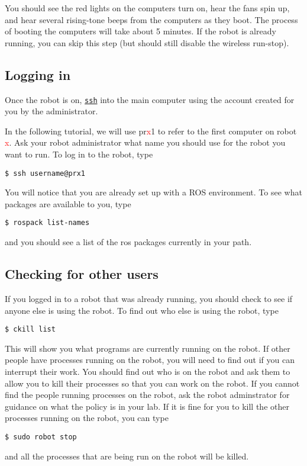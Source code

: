 You should see the red lights on the computers turn on, hear the fans spin up, and hear several rising-tone beeps from the computers 
as they boot.  The process of booting the computers will take about 5 minutes.  If the robot is already running, you can 
skip this step (but should still disable the wireless run-stop).
\subsection{Logging in}
Once the robot is on, \texttt{\href{http://unixhelp.ed.ac.uk/CGI/man-cgi?ssh}{ssh}} into the main computer using the account 
created for you by the administrator. 

In the following tutorial, we will use pr\textcolor{red}{x}1 to refer to the first computer on robot \textcolor{red}{x}.  
Ask your robot  administrator what name you should use for the robot you want to run. To log in to the robot, type
\begin{verbatim}
$ ssh username@prx1
\end{verbatim}
You will notice that you are already set up with a ROS environment.  To see what packages are available to you, type
\begin{verbatim}
$ rospack list-names
\end{verbatim}
and you should see a list of the ros packages currently in your path.

\subsection{Checking for other users}
If you logged in to a robot that was already running, you should check to see if anyone else is using the robot. To 
find out who else is using the robot, type
\begin{verbatim}
$ ckill list
\end{verbatim}
This will show you what programs are currently running on the robot.  If other people have processes running on the 
robot, you will need to find out if you can interrupt their work. You should find out who is on the robot and ask them 
to allow you to kill their processes so that you can work on the robot.  If you cannot find the people running processes 
on the robot, ask the robot adminstrator for guidance on what the policy is in your lab. If it is fine for you to kill 
the other processes running on the robot, you can type
\begin{verbatim}
$ sudo robot stop
\end{verbatim}
and all the processes that are being run on the robot will be killed.
